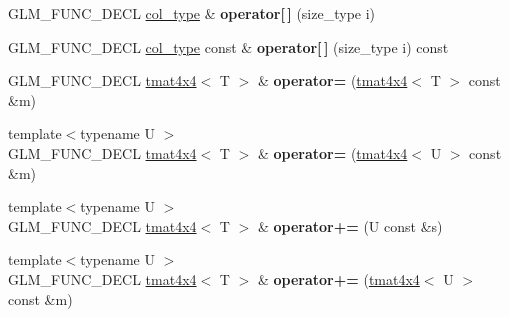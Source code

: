 \begin{DoxyCompactItemize}
\item 
\hypertarget{structglm_1_1detail_1_1tmat4x4_ad46837a63dd4782368f5a2ed560ec290}{G\-L\-M\-\_\-\-F\-U\-N\-C\-\_\-\-D\-E\-C\-L \hyperlink{structglm_1_1detail_1_1tvec4}{col\-\_\-type} \& {\bfseries operator\mbox{[}$\,$\mbox{]}} (size\-\_\-type i)}\label{structglm_1_1detail_1_1tmat4x4_ad46837a63dd4782368f5a2ed560ec290}

\item 
\hypertarget{structglm_1_1detail_1_1tmat4x4_abab1ebc5f1c69ffcd82adf3a61be5f5b}{G\-L\-M\-\_\-\-F\-U\-N\-C\-\_\-\-D\-E\-C\-L \hyperlink{structglm_1_1detail_1_1tvec4}{col\-\_\-type} const \& {\bfseries operator\mbox{[}$\,$\mbox{]}} (size\-\_\-type i) const }\label{structglm_1_1detail_1_1tmat4x4_abab1ebc5f1c69ffcd82adf3a61be5f5b}

\item 
\hypertarget{structglm_1_1detail_1_1tmat4x4_a427ed01d537b6650b3300bb07050d139}{G\-L\-M\-\_\-\-F\-U\-N\-C\-\_\-\-D\-E\-C\-L \hyperlink{structglm_1_1detail_1_1tmat4x4}{tmat4x4}$<$ T $>$ \& {\bfseries operator=} (\hyperlink{structglm_1_1detail_1_1tmat4x4}{tmat4x4}$<$ T $>$ const \&m)}\label{structglm_1_1detail_1_1tmat4x4_a427ed01d537b6650b3300bb07050d139}

\item 
\hypertarget{structglm_1_1detail_1_1tmat4x4_a49cf680083f738e77055e11e46ed0f4a}{{\footnotesize template$<$typename U $>$ }\\G\-L\-M\-\_\-\-F\-U\-N\-C\-\_\-\-D\-E\-C\-L \hyperlink{structglm_1_1detail_1_1tmat4x4}{tmat4x4}$<$ T $>$ \& {\bfseries operator=} (\hyperlink{structglm_1_1detail_1_1tmat4x4}{tmat4x4}$<$ U $>$ const \&m)}\label{structglm_1_1detail_1_1tmat4x4_a49cf680083f738e77055e11e46ed0f4a}

\item 
\hypertarget{structglm_1_1detail_1_1tmat4x4_a5ae04a4d51a7be3536488cc59428596e}{{\footnotesize template$<$typename U $>$ }\\G\-L\-M\-\_\-\-F\-U\-N\-C\-\_\-\-D\-E\-C\-L \hyperlink{structglm_1_1detail_1_1tmat4x4}{tmat4x4}$<$ T $>$ \& {\bfseries operator+=} (U const \&s)}\label{structglm_1_1detail_1_1tmat4x4_a5ae04a4d51a7be3536488cc59428596e}

\item 
\hypertarget{structglm_1_1detail_1_1tmat4x4_af115a3229ac0defb1c4ac0a76d143cf6}{{\footnotesize template$<$typename U $>$ }\\G\-L\-M\-\_\-\-F\-U\-N\-C\-\_\-\-D\-E\-C\-L \hyperlink{structglm_1_1detail_1_1tmat4x4}{tmat4x4}$<$ T $>$ \& {\bfseries operator+=} (\hyperlink{structglm_1_1detail_1_1tmat4x4}{tmat4x4}$<$ U $>$ const \&m)}\label{structglm_1_1detail_1_1tmat4x4_af115a3229ac0defb1c4ac0a76d143cf6}


\end{DoxyCompactItemize}
